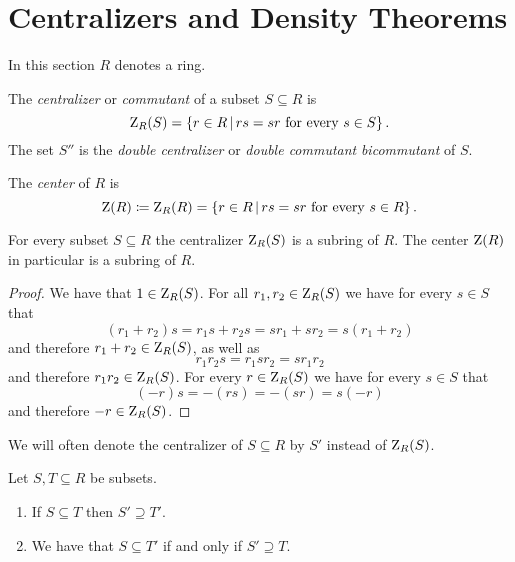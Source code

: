 \section{Centralizers and Density Theorems}


\begin{conventions}
  In this section $R$ denotes a ring.
\end{conventions}


\begin{definition}
  The \emph{centralizer} or \emph{commutant} of a subset $S \subseteq R$ is
  \[
      \centralizer_R(S)
    = \{
        r \in R
      \suchthat
        \text{$rs = sr$ for every $s \in S$}
      \} \,.
  \]
  The set $S''$ is the \emph{double centralizer} or \emph{double commutant} \emph{bicommutant} of $S$.
\end{definition}


\begin{definition}
  The \emph{center} of $R$ is
  \[
              \ringcenter(R)
    \defined  \centralizer_R(R)
    =         \{
                r \in R
              \suchthat
                \text{$rs = sr$ for every $s \in R$}
              \} \,.
  \]
\end{definition}


\begin{lemma}
  For every subset $S \subseteq R$ the centralizer $\operatorname{Z}_R(S)$ is a subring of $R$.
  The center $\operatorname{Z}(R)$ in particular is a subring of $R$.
\end{lemma}


\begin{proof}
  We have that $1 \in \operatorname{Z}_R(S)$.
  For all $r_1, r_2 \in \operatorname{Z}_R(S)$ we have for every $s \in S$ that
  \[
      (r_1 + r_2)s
    = r_1 s + r_2 s
    = s r_1 + s r_2
    = s (r_1 + r_2)
  \]
  and therefore $r_1 + r_2 \in \operatorname{Z}_R(S)$, as well as
  \[
      r_1 r_2 s
    = r_1 s r_2
    = s r_1 r_2
  \]
  and therefore $r_1 r_2 \in \operatorname{Z}_R(S)$.
  For every $r \in \operatorname{Z}_R(S)$ we have for every $s \in S$ that
  \[
      (-r) s
    = - (rs)
    = - (sr)
    = s (-r)
  \]
  and therefore $-r \in \operatorname{Z}_R(S)$.
\end{proof}


\begin{notation}
  We will often denote the centralizer of $S \subseteq R$ by $S'$ instead of $\operatorname{Z}_R(S)$.
\end{notation}


\begin{lemma}
  \label{lemma: centralizes is Galois connection}
  Let $S, T \subseteq R$ be subsets.
  \begin{enumerate}
    \item
      If $S \subseteq T$ then $S' \supseteq T'$.
    \item
      We have that $S \subseteq T'$ if and only if $S' \supseteq T$.
  \end{enumerate}
\end{lemma}


